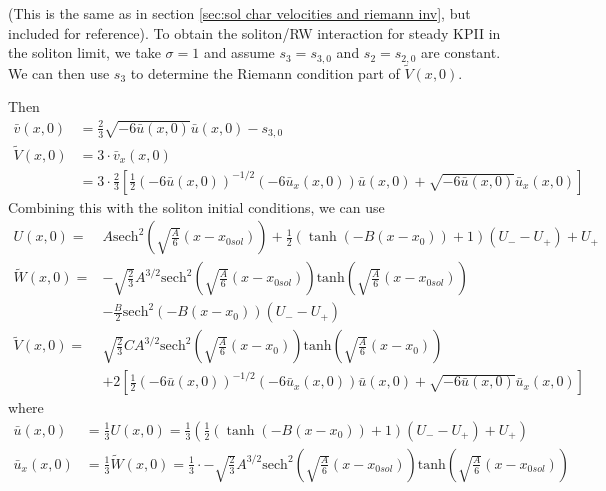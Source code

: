 \documentclass[12pt]{article}
\newcommand{\sech}[0]{\mathrm{sech}}
\numberwithin{equation}{section}
\begin{document}
(This is the same as in section \ref{sec:sol char velocities and riemann inv}, but included for reference). To obtain the soliton/RW interaction for steady KPII in the soliton limit, we take $\sigma = 1$ and assume $s_3 = s_{3,0}$ and $s_2 = s_{2,0}$ are constant. We can then use $s_3$ to determine the Riemann condition part of $\tilde{V}(x,0)$.

Then 
\begin{align*}
    \bar v(x,0) &= \frac{2}{3}\sqrt{-6\bar u(x,0)}\bar u (x,0) - s_{3,0} \\
    \tilde{V}(x,0)
    &= 3\cdot \bar v_x(x,0)\\
    &= 3\cdot \frac{2}{3}\left[\frac{1}{2}(-6\bar u(x,0))^{-1/2}(-6\bar u_x(x,0))\bar u(x,0) + \sqrt{-6\bar u(x,0)}\bar u_x(x,0)\right]
\end{align*}
Combining this with the soliton initial conditions, we can use
\begin{subequations}
    \begin{align}
         U(x,0) =& A\sech^2\left(\sqrt{\frac{A}{6}}(x-x_{0sol})\right) + \frac{1}{2}\left(\tanh\left(-B(x-x_0)\right) + 1\right)(U_--U_+) + U_+ \\
          \tilde{W}(x,0) =& -\sqrt{\frac{2}{3}}A^{3/2}\sech^2\left(\sqrt{\frac{A}{6}}(x-x_{0sol})\right)\mathrm{tanh}\left(\sqrt{\frac{A}{6}}(x-x_{0sol})\right) \nonumber \\
          & -\frac{B}{2}\sech^2\left(-B(x-x_0)\right)(U_--U_+) \\
        \tilde{V}(x,0) =& \sqrt{\frac{2}{3}}CA^{3/2}\sech^2\left(\sqrt{\frac{A}{6}}(x-x_0)\right)\mathrm{tanh}\left(\sqrt{\frac{A}{6}}(x-x_0)\right) \nonumber \\
          & + 2\left[\frac{1}{2}(-6\bar u(x,0))^{-1/2}(-6\bar u_x(x,0))\bar u(x,0) + \sqrt{-6\bar u(x,0)}\bar u_x(x,0)\right]
    \end{align} \label{soliton/RW initial cond}
\end{subequations}
where 
\begin{align}
    \bar u(x,0) &= \frac{1}{3}U(x,0) = \frac{1}{3}\left(\frac{1}{2}\left(\tanh\left(-B(x-x_0)\right) + 1\right)(U_--U_+) + U_+\right) \\
    \bar u_x(x,0) &= \frac{1}{3}\tilde{W}(x,0) = \frac{1}{3}\cdot -\sqrt{\frac{2}{3}}A^{3/2}\sech^2\left(\sqrt{\frac{A}{6}}(x-x_{0sol})\right)\mathrm{tanh}\left(\sqrt{\frac{A}{6}}(x-x_{0sol})\right)
\end{align}
\end{document}
